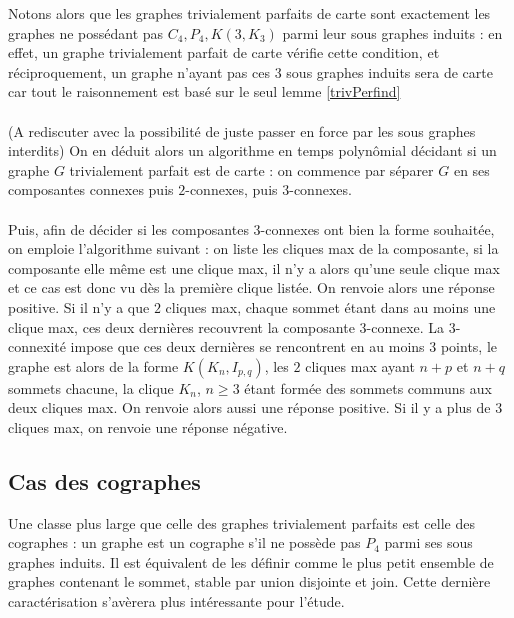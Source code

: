 \documentclass{scrartcl}
\begin{document}
\begin{flushleft}
Notons alors que les graphes trivialement parfaits de carte sont exactement les graphes ne possédant pas $C_4, P_4, K(3, K_3)$ parmi
leur sous graphes induits : en effet, un graphe trivialement parfait de carte vérifie cette condition, et réciproquement, un graphe
n'ayant pas ces $3$ sous graphes induits sera de carte car tout le raisonnement est basé sur le seul lemme \ref{trivPerfind}
\\~\\
(A rediscuter avec la possibilité de juste passer en force par les sous graphes interdits)
On en déduit alors un algorithme en temps polynômial décidant si un graphe $G$ trivialement parfait est de carte : on commence
par séparer $G$ en ses composantes connexes puis $2$-connexes, puis $3$-connexes.
\\~\\
Puis, afin de décider si les composantes $3$-connexes ont bien la forme souhaitée, on emploie l'algorithme suivant : on liste les cliques
max de la composante, si la composante elle même est une clique max, il n'y a alors qu'une seule clique max et ce cas est donc
vu dès la première clique listée. On renvoie alors une réponse positive. Si il n'y a que $2$ cliques max, chaque sommet étant
dans au moins une clique max, ces deux dernières recouvrent la composante $3$-connexe. La $3$-connexité impose que ces deux dernières
se rencontrent en au moins $3$ points, le graphe est alors de la forme $K(K_n, I_{p,q})$, les $2$ cliques max ayant $n+p$
et $n+q$ sommets chacune, la clique $K_n$, $n \geq 3$ étant formée des sommets communs aux deux cliques max. On renvoie alors
aussi une réponse positive. Si il y a plus de $3$ cliques max, on renvoie une réponse négative.

\subsection{Cas des cographes}

Une classe plus large que celle des graphes trivialement parfaits est celle des cographes : un graphe est un cographe s'il ne possède pas
$P_4$ parmi ses sous graphes induits. Il est équivalent de les définir comme le plus petit ensemble de graphes contenant le sommet, stable par
union disjointe et join. Cette dernière caractérisation s'avèrera plus intéressante pour l'étude.\\


\end{flushleft}
\end{document}
